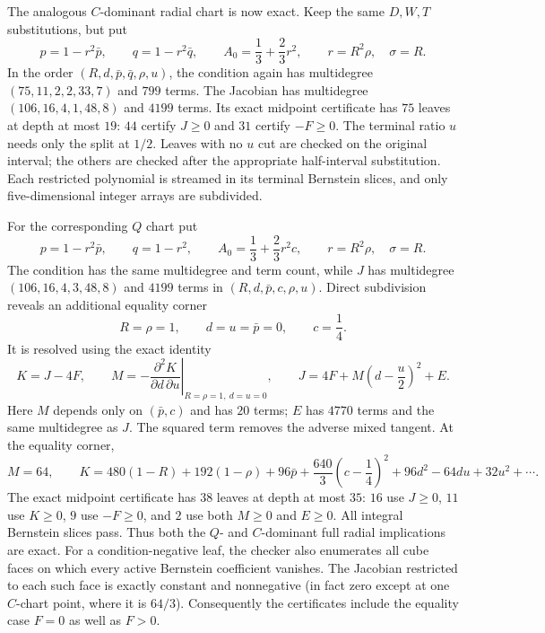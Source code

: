 \documentclass[11pt]{article}
\theoremstyle{remark}
\begin{document}
The analogous $C$-dominant radial chart is now exact.  Keep the same
$D,W,T$ substitutions, but put
\[
 p=1-r^2\bar p,\qquad q=1-r^2\bar q,\qquad
 A_0=\frac13+\frac23r^2,
 \qquad r=R^2\rho,\quad\sigma=R.
\]
In the order $(R,d,\bar p,\bar q,\rho,u)$, the condition again has
multidegree $(75,11,2,2,33,7)$ and $799$ terms.  The Jacobian has
multidegree $(106,16,4,1,48,8)$ and $4199$ terms.  Its exact midpoint
certificate has $75$ leaves at depth at most $19$: $44$ certify
$J\geq0$ and $31$ certify $-F\geq0$.  The terminal ratio $u$ needs only
the split at $1/2$.  Leaves with no $u$ cut are checked on the original
interval; the others are checked after the appropriate half-interval
substitution.  Each restricted polynomial is streamed in its terminal
Bernstein slices, and only five-dimensional integer arrays are subdivided.

For the corresponding $Q$ chart put
\[
 p=1-r^2\bar p,\qquad q=1-r^2,\qquad
 A_0=\frac13+\frac23r^2c,
 \qquad r=R^2\rho,\quad\sigma=R.
\]
The condition has the same multidegree and term count, while $J$ has
multidegree $(106,16,4,3,48,8)$ and $4199$ terms in
$(R,d,\bar p,c,\rho,u)$.  Direct subdivision reveals an additional
equality corner
\[
 R=\rho=1,\qquad d=u=\bar p=0,\qquad c=\frac14.
\]
It is resolved using the exact identity
\[
 K=J-4F,\qquad
 M=-\left.\frac{\partial^2K}{\partial d\,\partial u}
       \right|_{R=\rho=1,\ d=u=0},\qquad
 J=4F+M\left(d-\frac u2\right)^2+E.
\]
Here $M$ depends only on $(\bar p,c)$ and has $20$ terms; $E$ has
$4770$ terms and the same multidegree as $J$.  The squared term removes
the adverse mixed tangent.  At the equality corner,
\[
 M=64,\qquad
 K=480(1-R)+192(1-\rho)+96\bar p
   +\frac{640}{3}\left(c-\frac14\right)^2
   +96d^2-64du+32u^2+\cdots.
\]
The exact midpoint certificate has $38$ leaves at depth at most $35$:
$16$ use $J\geq0$, $11$ use $K\geq0$, $9$ use $-F\geq0$, and $2$
use both $M\geq0$ and $E\geq0$.  All integral Bernstein slices pass.
Thus both the $Q$- and $C$-dominant full radial implications are exact.
For a condition-negative leaf, the checker also enumerates all cube faces
on which every active Bernstein coefficient vanishes.  The Jacobian
restricted to each such face is exactly constant and nonnegative (in fact
zero except at one $C$-chart point, where it is $64/3$).  Consequently
the certificates include the equality case $F=0$ as well as $F>0$.
\end{document}
